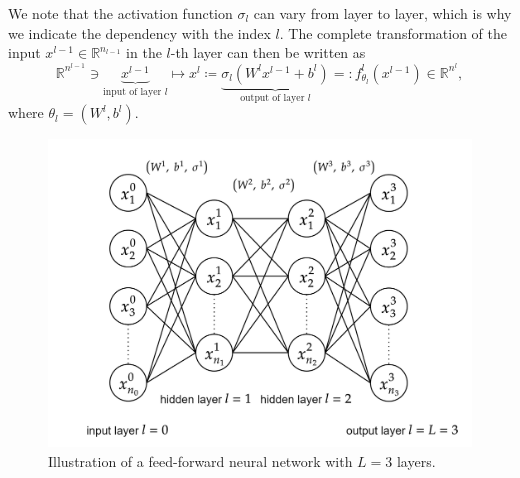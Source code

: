 We note that the activation function $\sigma_l$ can vary from layer to layer, which is why we indicate the dependency with the index $l$. The complete transformation of the input $x^{l-1} \in \mathbb{R}^{n_{l-1}}$ in the $l$-th layer can then be written as
\begin{equation}
    \label{action layer}
    \mathbb{R}^{n^{l-1}} \ni \underbrace{x^{l-1}}_{\text{input of layer } l} \mapsto x^{l}\coloneqq \underbrace{\sigma_{l}\left( W^{l} x^{l-1} + b^{l} \right)}_{\text{output of layer } l}=: f^{l}_{\theta_l} \left( x^{l-1} \right) \in \mathbb{R}^{n^{l}}, 
\end{equation}
where $\theta_l = (W^{l}, b^{l})$. \\

\begin{figure}[H]
    \begin{center}
        \includegraphics[scale=0.25]{img/diagram-20220206.png}
    \end{center}
    \caption{Illustration of a feed-forward neural network with $L=3$ layers.}
    \label{fig5}
\end{figure}

